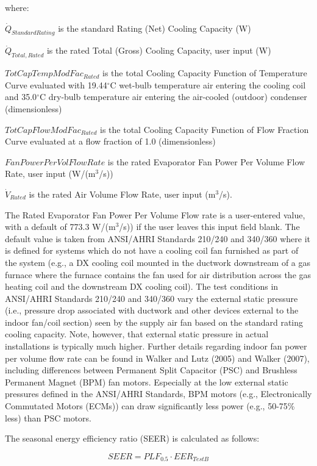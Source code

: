 where:

\({\dot Q_{StandardRating}}\) is the standard Rating (Net) Cooling Capacity (W)

\({\dot Q_{Total,Rated}}\) is the rated Total (Gross) Cooling Capacity, user input (W)

\(TotCapTempModFa{c_{Rated}}\) is the total Cooling Capacity Function of Temperature Curve evaluated with 19.44\(^{\circ}\)C wet-bulb temperature air entering the cooling coil and 35.0\(^{\circ}\)C dry-bulb temperature air entering the air-cooled (outdoor) condenser (dimensionless)

\(TotCapFlowModFa{c_{Rated}}\) is the total Cooling Capacity Function of Flow Fraction Curve evaluated at a flow fraction of 1.0 (dimensionless)

\(FanPowerPerVolFlowRate\) is the rated Evaporator Fan Power Per Volume Flow Rate, user input (W/(m\(^{3}\)/s))

\({\dot V_{Rated}}\) is the rated Air Volume Flow Rate, user input (m\(^{3}\)/s).

The Rated Evaporator Fan Power Per Volume Flow rate is a user-entered value, with a default of 773.3 W/(m\(^{3}\)/s)) if the user leaves this input field blank. The default value is taken from ANSI/AHRI Standards 210/240 and 340/360 where it is defined for systems which do not have a cooling coil fan furnished as part of the system (e.g., a DX cooling coil mounted in the ductwork downstream of a gas furnace where the furnace contains the fan used for air distribution across the gas heating coil and the downstream DX cooling coil). The test conditions in ANSI/AHRI Standards 210/240 and 340/360 vary the external static pressure (i.e., pressure drop associated with ductwork and other devices external to the indoor fan/coil section) seen by the supply air fan based on the standard rating cooling capacity. Note, however, that external static pressure in actual installations is typically much higher. Further details regarding indoor fan power per volume flow rate can be found in Walker and Lutz (2005) and Walker (2007), including differences between Permanent Split Capacitor (PSC) and Brushless Permanent Magnet (BPM) fan motors. Especially at the low external static pressures defined in the ANSI/AHRI Standards, BPM motors (e.g., Electronically Commutated Motors (ECMs)) can draw significantly less power (e.g., 50-75\% less) than PSC motors.

The seasonal energy efficiency ratio (SEER) is calculated as follows:

\begin{equation}
SEER = PL{F_{0.5}} \cdot EE{R_{TestB}}
\end{equation}


